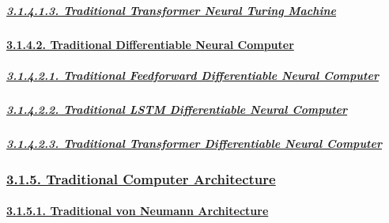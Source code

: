 \documentclass[
]{article}
\begin{document}
\hypertarget{traditional-transformer-neural-turing-machine}{%
\subparagraph{\texorpdfstring{\protect\hyperlink{traditional-transformer-neural-turing-machine-1}{3.1.4.1.3.
Traditional Transformer Neural Turing
Machine}}{3.1.4.1.3. Traditional Transformer Neural Turing Machine}}\label{traditional-transformer-neural-turing-machine}}

\hypertarget{traditional-differentiable-neural-computer}{%
\paragraph{\texorpdfstring{\protect\hyperlink{traditional-differentiable-neural-computer-1}{3.1.4.2.
Traditional Differentiable Neural
Computer}}{3.1.4.2. Traditional Differentiable Neural Computer}}\label{traditional-differentiable-neural-computer}}

\hypertarget{traditional-feedforward-differentiable-neural-computer}{%
\subparagraph{\texorpdfstring{\protect\hyperlink{traditional-feedforward-differentiable-neural-computer-1}{3.1.4.2.1.
Traditional Feedforward Differentiable Neural
Computer}}{3.1.4.2.1. Traditional Feedforward Differentiable Neural Computer}}\label{traditional-feedforward-differentiable-neural-computer}}

\hypertarget{traditional-lstm-differentiable-neural-computer}{%
\subparagraph{\texorpdfstring{\protect\hyperlink{traditional-lstm-differentiable-neural-computer-1}{3.1.4.2.2.
Traditional LSTM Differentiable Neural
Computer}}{3.1.4.2.2. Traditional LSTM Differentiable Neural Computer}}\label{traditional-lstm-differentiable-neural-computer}}

\hypertarget{traditional-transformer-differentiable-neural-computer}{%
\subparagraph{\texorpdfstring{\protect\hyperlink{traditional-transformer-differentiable-neural-computer-1}{3.1.4.2.3.
Traditional Transformer Differentiable Neural
Computer}}{3.1.4.2.3. Traditional Transformer Differentiable Neural Computer}}\label{traditional-transformer-differentiable-neural-computer}}

\hypertarget{traditional-computer-architecture}{%
\subsubsection{\texorpdfstring{\protect\hyperlink{traditional-computer-architecture-1}{3.1.5.
Traditional Computer
Architecture}}{3.1.5. Traditional Computer Architecture}}\label{traditional-computer-architecture}}

\hypertarget{traditional-von-neumann-architecture}{%
\paragraph{\texorpdfstring{\protect\hyperlink{traditional-von-neumann-architecture-1}{3.1.5.1.
Traditional von Neumann
Architecture}}{3.1.5.1. Traditional von Neumann Architecture}}\label{traditional-von-neumann-architecture}}
\end{document}
